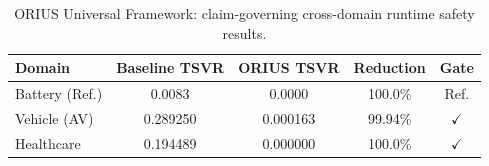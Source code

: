 \begin{table}[htbp]
\centering
\caption{ORIUS Universal Framework: claim-governing cross-domain runtime safety results.}
\label{tbl:all_domain_comparison}
\begin{tabular}{lcccc}
\toprule
\textbf{Domain} & \textbf{Baseline TSVR} & \textbf{ORIUS TSVR} & \textbf{Reduction} & \textbf{Gate} \\
\midrule
Battery (Ref.) & 0.0083 & 0.0000 & 100.0\% & Ref. \\
Vehicle (AV) & 0.289250 & 0.000163 & 99.94\% & $\checkmark$ \\
Healthcare & 0.194489 & 0.000000 & 100.0\% & $\checkmark$ \\
\bottomrule
\end{tabular}
\end{table}
